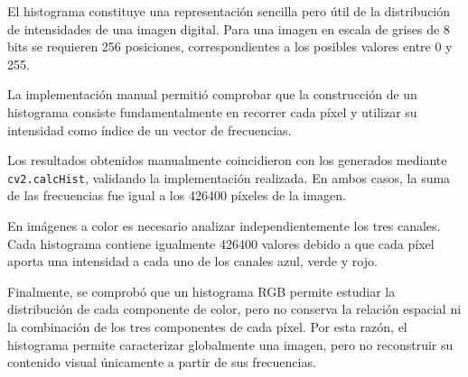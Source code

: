 \documentclass[11pt,letterpaper]{article}
\begin{document}
El histograma constituye una representación sencilla pero útil de la distribución de intensidades de una imagen digital. Para una imagen en escala de grises de 8 bits se requieren 256 posiciones, correspondientes a los posibles valores entre 0 y 255.

La implementación manual permitió comprobar que la construcción de un histograma consiste fundamentalmente en recorrer cada píxel y utilizar su intensidad como índice de un vector de frecuencias.

Los resultados obtenidos manualmente coincidieron con los generados mediante \texttt{cv2.calcHist}, validando la implementación realizada. En ambos casos, la suma de las frecuencias fue igual a los 426400 píxeles de la imagen.

En imágenes a color es necesario analizar independientemente los tres canales. Cada histograma contiene igualmente 426400 valores debido a que cada píxel aporta una intensidad a cada uno de los canales azul, verde y rojo.

Finalmente, se comprobó que un histograma RGB permite estudiar la distribución de cada componente de color, pero no conserva la relación espacial ni la combinación de los tres componentes de cada píxel. Por esta razón, el histograma permite caracterizar globalmente una imagen, pero no reconstruir su contenido visual únicamente a partir de sus frecuencias.
\end{document}

